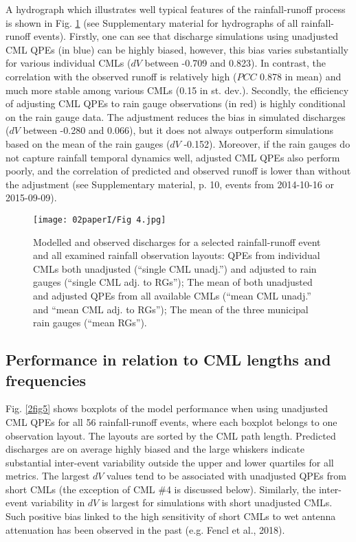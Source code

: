 \documentclass{ctuthesis}\usepackage[]{graphicx}\usepackage[]{color}
\begin{document}
A hydrograph which illustrates well typical features of the rainfall-runoff process is shown in Fig. \ref{2fig4} (see Supplementary material for hydrographs of all rainfall-runoff events). Firstly, one can see that discharge simulations using unadjusted CML QPEs (in blue) can be highly biased, however, this bias varies substantially for various individual CMLs ($dV$ between -0.709 and 0.823). In contrast, the correlation with the observed runoff is relatively high ($PCC$ 0.878 in mean) and much more stable among various CMLs (0.15 in st. dev.). Secondly, the efficiency of adjusting CML QPEs to rain gauge observations (in red) is highly conditional on the rain gauge data. The adjustment reduces the bias in simulated discharges ($dV$ between -0.280 and 0.066), but it does not always outperform simulations based on the mean of the rain gauges ($dV$ -0.152). Moreover, if the rain gauges do not capture rainfall temporal dynamics well, adjusted CML QPEs also perform poorly, and the correlation of predicted and observed runoff is lower than without the adjustment (see Supplementary material, p. 10, events from 2014-10-16 or 2015-09-09).

\begin{figure}[H]
\begin{center}
\texttt{[image: 02paperI/Fig 4.jpg]}
\caption{Modelled and observed discharges for a selected rainfall-runoff event and all examined rainfall observation layouts: QPEs from individual CMLs both unadjusted (“single CML unadj.”) and adjusted to rain gauges (“single CML adj. to RGs”); The mean of both unadjusted and adjusted QPEs from all available CMLs (“mean CML unadj.” and “mean CML adj. to RGs”); The mean of the three municipal rain gauges (“mean RGs”).} \label{2fig4}
\end{center}
\end{figure}

\subsection{Performance in relation to CML lengths and frequencies}

Fig. \ref{2fig5} shows boxplots of the model performance when using unadjusted CML QPEs for all 56 rainfall-runoff events, where each boxplot belongs to one observation layout. The layouts are sorted by the CML path length. Predicted discharges are on average highly biased and the large whiskers indicate substantial inter-event variability outside the upper and lower quartiles for all metrics. The largest $dV$ values tend to be associated with unadjusted QPEs from short CMLs (the exception of CML \#4 is discussed below). Similarly, the inter-event variability in $dV$ is largest for simulations with short unadjusted CMLs. Such positive bias linked to the high sensitivity of short CMLs to wet antenna attenuation has been observed in the past (e.g. Fencl et al., 2018).
\end{document}
